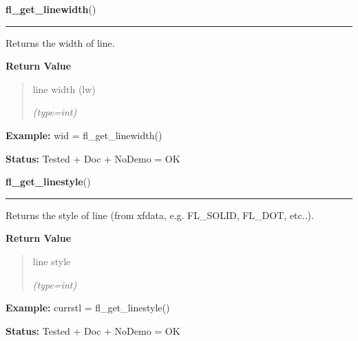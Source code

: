 \hspace{.8\funcindent}\begin{boxedminipage}{\funcwidth}

    \raggedright \textbf{fl\_get\_linewidth}()

    \vspace{-1.5ex}

    \rule{\textwidth}{0.5\fboxrule}
\setlength{\parskip}{2ex}
    Returns the width of line.

\setlength{\parskip}{1ex}
      \textbf{Return Value}
    \vspace{-1ex}

      \begin{quote}
      line width (lw)

      {\it (type=int)}

      \end{quote}

\textbf{Example:} wid = fl\_get\_linewidth()



\textbf{Status:} Tested + Doc + NoDemo = OK



    \end{boxedminipage}

    \label{xformslib:flxbasic:fl_get_linestyle}

    \vspace{0.5ex}

\hspace{.8\funcindent}\begin{boxedminipage}{\funcwidth}

    \raggedright \textbf{fl\_get\_linestyle}()

    \vspace{-1.5ex}

    \rule{\textwidth}{0.5\fboxrule}
\setlength{\parskip}{2ex}
    Returns the style of line (from xfdata, e.g. FL\_SOLID, FL\_DOT, 
    etc..).

\setlength{\parskip}{1ex}
      \textbf{Return Value}
    \vspace{-1ex}

      \begin{quote}
      line style

      {\it (type=int)}

      \end{quote}

\textbf{Example:} currstl = fl\_get\_linestyle()



\textbf{Status:} Tested + Doc + NoDemo = OK



    \end{boxedminipage}

